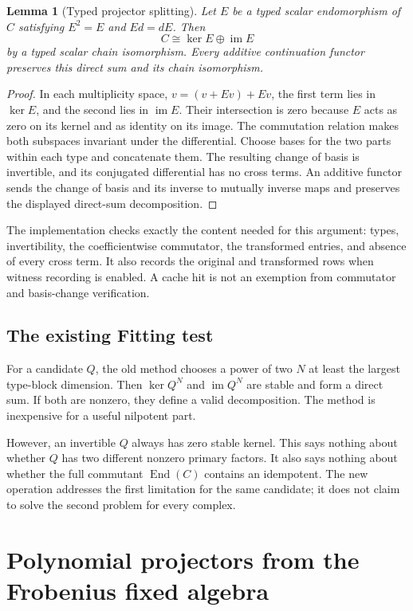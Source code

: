 \documentclass[11pt,a4paper]{article}
\newtheorem{lemma}[theorem]{Lemma}
\theoremstyle{definition}\newtheorem{definition}[theorem]{Definition}
\theoremstyle{remark}\newtheorem{remark}[theorem]{Remark}
\newcommand{\End}{\operatorname{End}}
\newcommand{\im}{\operatorname{im}}
\begin{document}
\begin{lemma}[Typed projector splitting]\label{lem:projector}
Let $E$ be a typed scalar endomorphism of $C$ satisfying $E^2=E$ and $Ed=dE$.
Then
\[
 C\cong \ker E\oplus\im E
\]
by a typed scalar chain isomorphism. Every additive continuation functor
preserves this direct sum and its chain isomorphism.
\end{lemma}
\begin{proof}
In each multiplicity space, $v=(v+Ev)+Ev$, the first term lies in $\ker E$,
and the second lies in $\im E$. Their intersection is zero because $E$ acts
as zero on its kernel and as identity on its image. The commutation relation
makes both subspaces invariant under the differential. Choose bases for
the two parts within each type and concatenate them. The resulting change
of basis is invertible, and its conjugated differential has no cross terms.
An additive functor sends the change of basis and its inverse to mutually
inverse maps and preserves the displayed direct-sum decomposition.
\end{proof}

The implementation checks exactly the content needed for this argument:
types, invertibility, the coefficientwise commutator, the transformed
entries, and absence of every cross term. It also records the original and
transformed rows when witness recording is enabled. A cache hit is not an
exemption from commutator and basis-change verification.

\subsection{The existing Fitting test}

For a candidate $Q$, the old method chooses a power of two $N$ at least the
largest type-block dimension. Then $\ker Q^N$ and $\im Q^N$ are stable and
form a direct sum. If both are nonzero, they define a valid decomposition.
The method is inexpensive for a useful nilpotent part.

However, an invertible $Q$ always has zero stable kernel. This says nothing
about whether $Q$ has two different nonzero primary factors. It also says
nothing about whether the full commutant $\End(C)$ contains an idempotent.
The new operation addresses the first limitation for the same candidate;
it does not claim to solve the second problem for every complex.

\section{Polynomial projectors from the Frobenius fixed algebra}
\label{sec:berlekamp}
\end{document}
